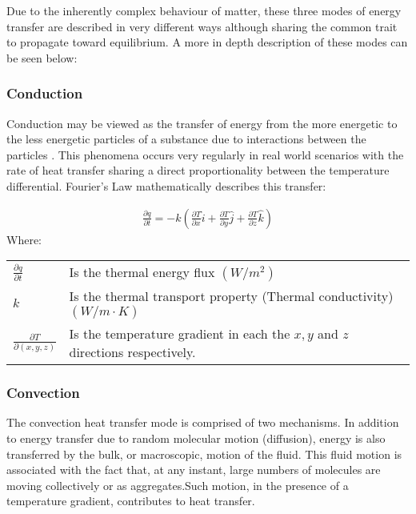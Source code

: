 \documentclass[12pt]{article}
\newcommand{\ts}{\textsuperscript}
\newcommand{\pe}{\vspace{0.3cm}}
\newcommand{\mycite}[1]{\ts{\cite{#1}}}
\begin{document}
Due to the inherently complex behaviour of matter, these three modes of energy transfer are described in very different ways although sharing the common trait to propagate toward equilibrium. A more in depth description of these modes can be seen below:  

\subsubsection{Conduction}
Conduction may be viewed as the transfer of energy from the more energetic to the less
energetic particles of a substance due to interactions between the particles \mycite{bergman2011fundamentals}. This phenomena occurs very regularly in real world scenarios with the rate of heat transfer sharing a direct proportionality between the temperature differential. Fourier's Law mathematically describes this transfer:

\begin{align} \label{condCart}
\frac{\partial q}{\partial t} = -k \left( \frac{\partial T}{\partial x} \hat{i} + \frac{\partial T}{\partial y} \hat{j} + \frac{\partial T}{\partial z} \hat{k} \right)
\end{align}
Where: \\ 
\begin{tabular}{l | l}
	$\frac{\partial q}{\partial t}$ & Is the thermal energy flux $(W/m^2)$ \\ 
	$k$ & Is the thermal transport property (Thermal conductivity) $(W/m \cdot K)$ \\ 
	$\frac{\partial T}{\partial(x,y,z)}$ & Is the temperature gradient in each the $x,y$ and $z$ directions respectively. 
\end{tabular}


\subsubsection{Convection}
The convection heat transfer mode is comprised of two mechanisms. In addition to energy
transfer due to random molecular motion (diffusion), energy is also transferred by the bulk, or macroscopic, motion of the fluid. This fluid motion is associated with the fact that, at any instant, large numbers of molecules are moving collectively or as aggregates.Such motion, in the presence of a temperature gradient, contributes to heat transfer\mycite{bergman2011fundamentals}.  
\pe  
\end{document}
